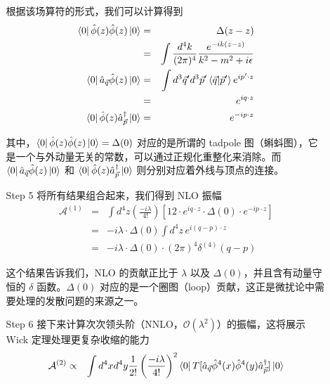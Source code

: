 \begin{example}
\begin{solution}
\begin{enumerate}
\begin{itemize}
                根据该场算符的形式，我们可以计算得到
                \begin{eqnarray*}
                    \bra{0} \hat{\phi}(z)\hat{\phi}(z) \ket{0} &=& \Delta(z - z)\\
                    &=& \int \frac{d^4 k}{(2\pi)^4} \frac{e^{-ik(z - z)}}{k^2 - m^2 + i\epsilon}\\
                    \bra{0} \hat{a}_{\vec{q}}\hat{\phi}(z) \ket{0} &=& \int d^3 \vec{q}^\prime d^3 \vec{p}^\prime \braket{\vec{q}}{\vec{p}^\prime}e^{i p^\prime \cdot z} \\
                    &=& e^{iq\cdot z} \\
                    \bra{0} \hat{\phi}(z)\hat{a}_{\vec{p}}^\dagger \ket{0} &=& e^{-ip\cdot z}
                \end{eqnarray*}

                其中，$\bra{0} \hat{\phi}(z)\hat{\phi}(z) \ket{0} = \Delta(0)$ 对应的是所谓的 tadpole 图（蝌蚪图），它是一个与外动量无关的常数，可以通过正规化重整化来消除。而 $\bra{0} \hat{a}_{\vec{q}}\hat{\phi}(z) \ket{0}$ 和 $\bra{0} \hat{\phi}(z)\hat{a}_{\vec{p}}^\dagger \ket{0}$ 则分别对应着外线与顶点的连接。

                \item[Step 5] 将所有结果组合起来，我们得到 NLO 振幅
                \begin{eqnarray*}
                    \mathcal{A}^{(1)} &=& \int d^4z \left(\frac{-i\lambda}{4!}\right)\left[12 \cdot e^{iq\cdot z} \cdot \Delta(0) \cdot e^{-ip\cdot z}\right] \\
                    &=& -i\lambda \cdot \Delta(0) \int d^4z \, e^{i(q-p)\cdot z} \\
                    &=& -i\lambda \cdot \Delta(0) \cdot (2\pi)^4 \delta^{(4)}(q - p)
                \end{eqnarray*}

                这个结果告诉我们，NLO 的贡献正比于 $\lambda$ 以及 $\Delta(0)$，并且含有动量守恒的 $\delta$ 函数。$\Delta(0)$ 对应的是一个圈图（loop）贡献，这正是微扰论中需要处理的发散问题的来源之一。

                \item[Step 6] 接下来计算次次领头阶（NNLO，$\mathcal{O}(\lambda^2)$）的振幅，这将展示 Wick 定理处理更复杂收缩的能力
                \begin{eqnarray*}
                    \mathcal{A}^{(2)} &\propto& \int d^4x d^4y \frac{1}{2!}\left(\frac{-i\lambda}{4!}\right)^2 \bra{0}T[\hat{a}_{\vec{q}}\hat{\phi}^4(x)\hat{\phi}^4(y)\hat{a}_{\vec{p}}^\dagger]\ket{0}
                \end{eqnarray*}


\end{itemize}
\end{enumerate}
\end{solution}
\end{example}
